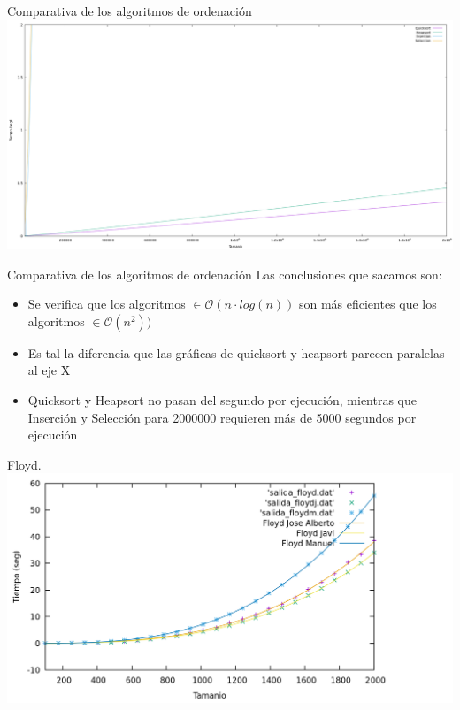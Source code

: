 \documentclass[10pt, xcolor=table]{beamer}
\begin{document}
\begin{frame}[fragile]{Comparativa de los algoritmos de ordenación}
	\centering
	\includegraphics[scale=0.2]{../../Images/Gráfica comparativa algoritmos ordenación Joshoccas (H y Q).png}
\end{frame}

\begin{frame}[fragile]{Comparativa de los algoritmos de ordenación}
Las conclusiones que sacamos son:
\begin{itemize}
	\item Se verifica que los algoritmos \(\in \mathcal{O}(n \cdot log(n))\) son más eficientes que los algoritmos \(\in \mathcal{O}(n^2))\)
	\item Es tal la diferencia que las gráficas de quicksort y heapsort parecen paralelas al eje X
	\item Quicksort y Heapsort no pasan del segundo por ejecución, mientras que Inserción y Selección para 2000000 requieren más de 5000 segundos por ejecución
\end{itemize}
\end{frame}

\begin{frame}{Floyd.
}
\centering
\includegraphics[scale=0.15]{../../Images/floyd_combinados.png}
\end{frame}
\end{document}
